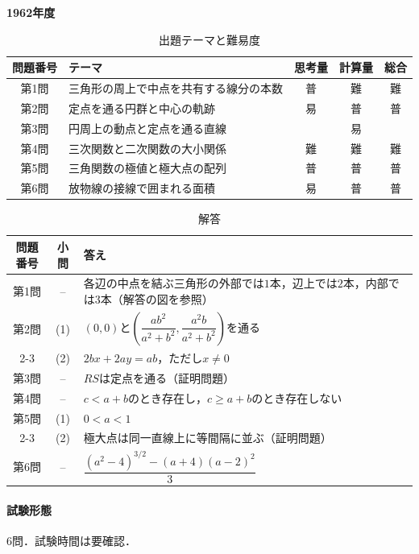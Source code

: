\documentclass[../../main.tex]{subfiles}
\begin{document}
\begin{center}
  {\fontsize{48pt}{58pt}\selectfont \textbf{1962}\normalsize\textbf{年度}}
\end{center}

\begin{table}[htb]
  \centering
  \caption{出題テーマと難易度}
  \begin{tabular}{|c|p{6.2cm}|c|c|c|}
    \hline
    \textbf{問題番号} & \textbf{テーマ} & \textbf{思考量} & \textbf{計算量} & \textbf{総合} \\
    \hline
    第1問 & 三角形の周上で中点を共有する線分の本数 & 普 & 難 & 難 \\
    \hline
    第2問 & 定点を通る円群と中心の軌跡 & 易 & 普 & 普 \\
    \hline
    第3問 & 円周上の動点と定点を通る直線 &  & 易 &  \\
    \hline
    第4問 & 三次関数と二次関数の大小関係 & 難 & 難 & 難 \\
    \hline
    第5問 & 三角関数の極値と極大点の配列 & 普 & 普 & 普 \\
    \hline
    第6問 & 放物線の接線で囲まれる面積 & 易 & 普 & 普 \\
    \hline
  \end{tabular}
\end{table}

\begin{table}[htb]
  \centering
  \caption{解答}
  \renewcommand{\arraystretch}{1.4}
  \begin{tabular}{|c|c|p{9cm}|}
    \hline
    \textbf{問題番号} & \textbf{小問} & \textbf{答え} \\
    \hline
    第1問 & -- & 各辺の中点を結ぶ三角形の外部では$1$本，辺上では$2$本，内部では$3$本（解答の図を参照） \\
    \hline
    第2問 & (1) & $(0,0)$と$\left(\dfrac{ab^2}{a^2+b^2},\dfrac{a^2b}{a^2+b^2}\right)$を通る \\
    \cline{2-3}
    & (2) & $2bx+2ay=ab$，ただし$x\ne0$ \\
    \hline
    第3問 & -- & $RS$は定点を通る（証明問題） \\
    \hline
    第4問 & -- & $c<a+b$のとき存在し，$c\ge a+b$のとき存在しない \\
    \hline
    第5問 & (1) & $0<a<1$ \\
    \cline{2-3}
    & (2) & 極大点は同一直線上に等間隔に並ぶ（証明問題） \\
    \hline
    第6問 & -- & $\dfrac{(a^2-4)^{3/2}-(a+4)(a-2)^2}{3}$ \\
    \hline
  \end{tabular}
\end{table}

\paragraph{試験形態}
6問．試験時間は要確認．
\end{document}
